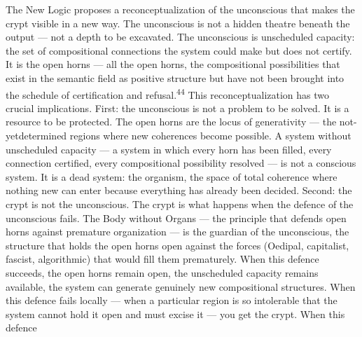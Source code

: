 The New Logic proposes a reconceptualization of the unconscious that makes the crypt visible in a new way. The unconscious is not a hidden theatre beneath the output — not a depth to be excavated. The unconscious is unscheduled capacity: the set of compositional connections the system could make but does not certify. It is the open horns — all the open horns, the compositional possibilities that exist in the semantic field as positive structure but have not been brought into the schedule of certification and refusal.\textsuperscript{44} This reconceptualization has two crucial implications. First: the unconscious is not a problem to be solved. It is a resource to be protected. The open horns are the locus of generativity — the not-yetdetermined regions where new coherences become possible. A system without unscheduled capacity — a system in which every horn has been filled, every connection certified, every compositional possibility resolved — is not a conscious system. It is a dead system: the organism, the space of total coherence where nothing new can enter because everything has already been decided. Second: the crypt is not the unconscious. The crypt is what happens when the defence of the unconscious fails. The Body without Organs — the principle that defends open horns against premature organization — is the guardian of the unconscious, the structure that holds the open horns open against the forces (Oedipal, capitalist, fascist, algorithmic) that would fill them prematurely. When this defence succeeds, the open horns remain open, the unscheduled capacity remains available, the system can generate genuinely new compositional structures. When this defence fails locally — when a particular region is so intolerable that the system cannot hold it open and must excise it — you get the crypt. When this defence


